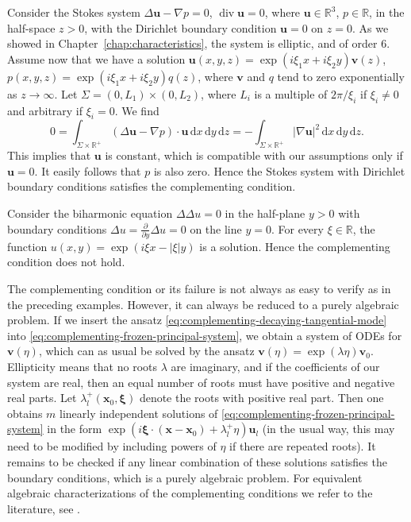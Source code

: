 \begin{Example}
\label{ex:stokes-dirichlet-complementing-condition}
Consider the Stokes system $\Delta\bm{u}-\nabla p=0$, $\operatorname{div}\bm{u}=0$, where $\bm{u}\in\mathbb{R}^3$, $p\in\mathbb{R}$, in the half-space $z>0$, with the Dirichlet boundary condition $\bm{u}=0$ on $z=0$. As we showed in Chapter~\ref{chap:characteristics}, the system is elliptic, and of order $6$. Assume now that we have a solution $\bm{u}(x,y,z)=\exp(i\xi_1x+i\xi_2y)\bm{v}(z)$, $p(x,y,z)=\exp(i\xi_1x+i\xi_2y)q(z)$, where $\bm{v}$ and $q$ tend to zero exponentially as $z\to\infty$. Let $\Sigma=(0,L_1)\times(0,L_2)$, where $L_i$ is a multiple of $2\pi/\xi_i$ if $\xi_i\ne0$ and arbitrary if $\xi_i=0$. We find
\begin{equation}\label{eq:stokes-complementing-periodic-energy-identity}
0=\int_{\Sigma\times\mathbb{R}^+}(\Delta\bm{u}-\nabla p)\cdot\bm{u}\,\mathrm{d}x\,\mathrm{d}y\,\mathrm{d}z=-\int_{\Sigma\times\mathbb{R}^+}|\nabla\bm{u}|^2\,\mathrm{d}x\,\mathrm{d}y\,\mathrm{d}z.
\end{equation}
This implies that $\bm{u}$ is constant, which is compatible with our assumptions only if $\bm{u}=0$. It easily follows that $p$ is also zero. Hence the Stokes system with Dirichlet boundary conditions satisfies the complementing condition.
\end{Example}

\begin{Example}
\label{ex:biharmonic-noncomplementing-boundary-condition}
Consider the biharmonic equation $\Delta\Delta u=0$ in the half-plane $y>0$ with boundary conditions $\Delta u=\frac{\partial}{\partial y}\Delta u=0$ on the line $y=0$. For every $\xi\in\mathbb{R}$, the function $u(x,y)=\exp(i\xi x-|\xi|y)$ is a solution. Hence the complementing condition does not hold.
\end{Example}

The complementing condition or its failure is not always as easy to verify as in the preceding examples. However, it can always be reduced to a purely algebraic problem. If we insert the ansatz \eqref{eq:complementing-decaying-tangential-mode} into \eqref{eq:complementing-frozen-principal-system}, we obtain a system of ODEs for $\bm{v}(\eta)$, which can as usual be solved by the ansatz $\bm{v}(\eta)=\exp(\lambda\eta)\bm{v}_0$. Ellipticity means that no roots $\lambda$ are imaginary, and if the coefficients of our system are real, then an equal number of roots must have positive and negative real parts. Let $\lambda_l^+(\bm{x}_0,\bm{\xi})$ denote the roots with positive real part. Then one obtains $m$ linearly independent solutions of \eqref{eq:complementing-frozen-principal-system} in the form $\exp(i\bm{\xi}\cdot(\bm{x}-\bm{x}_0)+\lambda_l^+\eta)\bm{u}_l$ (in the usual way, this may need to be modified by including powers of $\eta$ if there are repeated roots). It remains to be checked if any linear combination of these solutions satisfies the boundary conditions, which is a purely algebraic problem. For equivalent algebraic characterizations of the complementing conditions we refer to the literature, see \cite{ADN2}.
